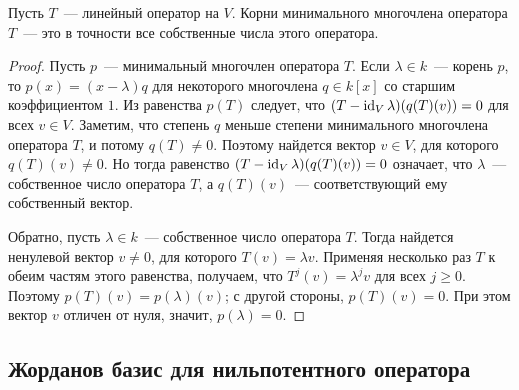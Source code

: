 \begin{proposition}\label{prop:roots-of-minuimal-are-eigenvalues}
Пусть $T$~--- линейный оператор на $V$. Корни минимального многочлена
оператора $T$~--- это в точности все собственные числа этого оператора.
\end{proposition}
\begin{proof}
Пусть $p$~--- минимальный многочлен оператора $T$.
Если $\lambda\in k$~--- корень $p$, то $p(x) = (x-\lambda)q$
для некоторого многочлена $q\in k[x]$ со старшим коэффициентом $1$.
Из равенства $p(T)$ следует, что
$(T-\operatorname{id}_V\lambda)(q(T)(v))=0$ для всех $v\in V$.
Заметим, что степень $q$ меньше степени минимального многочлена оператора $T$,
и потому $q(T)\neq 0$. Поэтому найдется вектор $v\in V$, для которого
$q(T)(v)\neq 0$. Но тогда равенство $(T-\operatorname{id}_V\lambda)(q(T)(v))=0$ означает,
что $\lambda$~--- собственное число оператора $T$, а $q(T)(v)$~---
соответствующий ему собственный вектор.

Обратно, пусть $\lambda\in k$~--- собственное число оператора $T$.
Тогда найдется ненулевой вектор $v\neq 0$, для которого
$T(v) = \lambda v$. Применяя несколько раз $T$ к обеим частям этого равенства,
получаем, что $T^j(v) = \lambda^j v$ для всех $j\geq 0$.
Поэтому $p(T)(v)= p(\lambda)(v)$; с другой стороны, $p(T)(v)=0$.
При этом вектор $v$ отличен от нуля, значит, $p(\lambda)=0$.
\end{proof}

\subsection{Жорданов базис для нильпотентного оператора}


